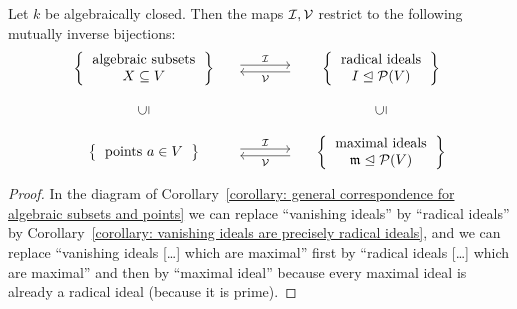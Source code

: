 \begin{corollary}
  \label{corollary: algebraically closed correspondence for algebraic subsets and points}
  Let $k$ be algebraically closed.
  Then the maps $\mathcal{I}, \mathcal{V}$ restrict to the following mutually inverse bijections:
  \[
    \begin{matrix}
        \left\{
          \begin{tabular}{c}
              algebraic subsets \\
              $X \subseteq V$
          \end{tabular}
        \right\}
      & \begin{tikzcd}[column sep = large]
            {}
            \arrow[shift left]{r}{\mc{I}}
          & {}
            \arrow[shift left]{l}{\mc{V}}
        \end{tikzcd}
      & \left\{
          \begin{tabular}{c}
            radical ideals \\
            $I \idealeq \mc{P}(V)$
          \end{tabular}
        \right\}
      \\
        {}
      & {}
      & {}
      \\
        \rotatebox[origin=c]{90}{$\subseteq$}
      & {}
      & \rotatebox[origin=c]{90}{$\subseteq$}
      \\
        {}
      & {}
      & {}
      \\
        \left\{
          \begin{tabular}{c}
            points $a \in V$
          \end{tabular}
        \right\}
      & \begin{tikzcd}[column sep = large]
            {}
            \arrow[shift left]{r}{\mc{I}}
          & {}
            \arrow[shift left]{l}{\mc{V}}
        \end{tikzcd}
      & \left\{
          \begin{tabular}{c}
            maximal ideals \\
            $\mf{m} \idealeq \mc{P}(V)$
          \end{tabular}
        \right\}
    \end{matrix}
  \]
\end{corollary}


\begin{proof}
  In the diagram of Corollary~\ref{corollary: general correspondence for algebraic subsets and points} we can replace \enquote{vanishing ideals} by \enquote{radical ideals} by Corollary~\ref{corollary: vanishing ideals are precisely radical ideals}, and we can replace \enquote{vanishing ideals [\dots] which are maximal} first by \enquote{radical ideals [\dots] which are maximal} and then by \enquote{maximal ideal} because every maximal ideal is already a radical ideal (because it is prime).
\end{proof}


